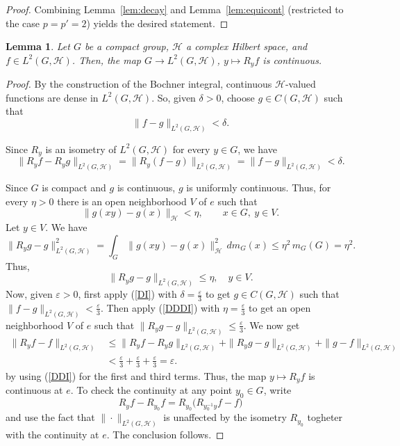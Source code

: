\documentclass[10pt,a4paper]{amsart}
\newtheorem{lemma}[theorem]{Lemma}
\begin{document}
\begin{proof}
 Combining Lemma~\ref{lem:decay}  and  Lemma~\ref{lem:equicont} (restricted  to the case $p=p'=2$)  yields the desired statement.
\end{proof}

\begin{lemma}\label{lemma:translation-continuous}
Let $G$ be a compact group, $\mathcal{H}$ a complex Hilbert space, and $f\in L^2(G,\mathcal{H})$.
Then, the map $G\to L^2(G,\mathcal{H})$, $y\mapsto R_yf$ is continuous. 
\end{lemma}

\begin{proof}
By the construction of the Bochner integral,  continuous $\mathcal{H}$-valued functions are dense
in $L^2(G,\mathcal{H})$. So, given $\delta>0$, choose $g\in C(G,\mathcal{H})$ such that
\begin{equation}\label{DI}
\|f-g\|_{L^2(G,\mathcal{H})}<\delta.
\end{equation}

Since  $R_y$ is an isometry of $L^2(G,\mathcal{H})$ for every $y\in G$,  we have
\begin{equation}\label{DDI}
\|R_yf-R_yg\|_{L^2(G,\mathcal{H})}=\|R_y(f-g)\|_{L^2(G,\mathcal{H})}=\|f-g\|_{L^2(G,\mathcal{H})}<\delta.
\end{equation}



Since $G$ is compact and $g$ is continuous, $g$ is uniformly continuous. Thus, for every
$\eta>0$ there is an open neighborhood $V$ of $e$ such that
$$
\|g(xy)-g(x)\|_\mathcal{H}<\eta,\qquad x\in G,\ y\in V.
$$
 Let  $y\in V$. We have
$$
\|R_yg-g\|_{L^2(G,\mathcal{H})}^2=\int_G\|g(xy)-g(x)\|_\mathcal{H}^2\,dm_G(x)\le\eta^2\,m_G(G)=\eta^2.
$$
Thus, 
\begin{equation}\label{DDDI}
\|R_yg-g\|_{L^2(G,\mathcal{H})}\le\eta,\quad
y\in V.
\end{equation}
Now,  given $\varepsilon>0$, first
apply  (\ref{DI}) with $\delta=\frac{\varepsilon}{3}$ to get $g\in C(G,\mathcal{H})$ such that
$\|f-g\|_{L^2(G,\mathcal{H})}<\frac{\varepsilon}{3}$. Then apply (\ref{DDDI}) with $\eta=\frac{\varepsilon}{3}$ to
get an open neighborhood $V$ of $e$ such that $\|R_yg-g\|_{L^2(G,\mathcal{H})}\le\frac{\varepsilon}{3}$. We now get
\begin{align*}
\|R_yf-f\|_{L^2(G,\mathcal{H})}&\le\|R_yf-R_yg\|_{L^2(G,\mathcal{H})}+\|R_yg-g\|_{L^2(G,\mathcal{H})}+
\|g-f\|_{L^2(G,\mathcal{H})}\\
&<\frac{\varepsilon}{3}+\frac{\varepsilon}{3}+\frac{\varepsilon}{3}=\varepsilon.
\end{align*}
by using (\ref{DDI}) for the first and third terms.
Thus, the map $y\mapsto R_yf$ is continuous at $e$. To check the continuity at any point $y_0\in G$, write
$$R_yf-R_{y_0}f=R_{y_0}\big(R_{y_0^{-1}y}f-f\big)$$
and  use the fact that $\|\cdot\|_{L^2(G,\mathcal{H})}$
is unaffected by the isometry $R_{y_0}$ togheter with the continuity at $e$. The conclusion follows.
\end{proof}
\end{document}
